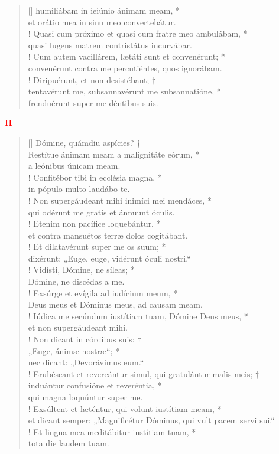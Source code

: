 \begin{verse}[\versewidth]
humiliábam in ieiúnio ánimam meam, *\\
et orátio mea in sinu meo convertebátur.\\!
\vin Quasi cum próximo et quasi cum fratre meo ambulábam, *\\
\vin quasi lugens matrem contristátus incurvábar.\\!
Cum autem vacillárem, lætáti sunt et convenérunt; *\\
convenérunt contra me percutiéntes, quos ignorábam.\\!
\vin Diripuérunt, et non desistébant; †\\
\vin tentavérunt me, subsannavérunt me subsannatióne, *\\
\vin frenduérunt super me déntibus suis.\\
\end{verse}
\begin{center}
\textcolor{red}{\bf II}
\end{center}
\begin{verse}[\versewidth]
Dómine, quámdiu aspícies? †\\
Restítue ánimam meam a malignitáte eórum, *\\
a leónibus únicam meam.\\!
\vin Confitébor tibi in ecclésia magna, *\\
\vin in pópulo multo laudábo te.\\!
Non supergáudeant mihi inimíci mei mendáces, *\\
qui odérunt me gratis et ánnuunt óculis.\\!
\vin Etenim non pacífice loquebántur, *\\
\vin et contra mansuétos terræ dolos cogitábant.\\!
Et dilatavérunt super me os suum; *\\
dixérunt: „Euge, euge, vidérunt óculi nostri.“\\!
\vin Vidísti, Dómine, ne síleas; *\\
\vin Dómine, ne discédas a me.\\!
Exsúrge et evígila ad iudícium meum, *\\
Deus meus et Dóminus meus, ad causam meam.\\!
\vin Iúdica me secúndum iustítiam tuam, Dómine Deus meus, *\\
\vin et non supergáudeant mihi.\\!
Non dicant in córdibus suis: †\\
„Euge, ánimæ nostræ“; *\\
nec dicant: „Devorávimus eum.“\\!
\vin Erubéscant et revereántur simul, qui gratulántur malis meis; †\\
\vin induántur confusióne et reveréntia, *\\
\vin qui magna loquúntur super me.\\!
Exsúltent et læténtur, qui volunt iustítiam meam, *\\
et dicant semper: „Magnificétur Dóminus, qui vult pacem servi sui.“\\!
\vin Et lingua mea meditábitur iustítiam tuam, *\\
\vin tota die laudem tuam.\\
\end{verse}
\vspace{1cm}



